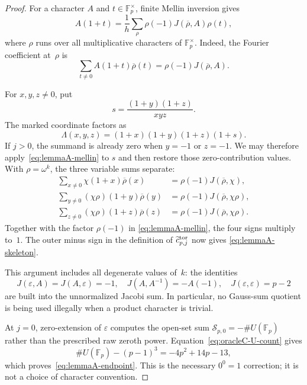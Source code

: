 \begin{proof}
For a character $A$ and $t\in\mathbb F_p^\times$, finite Mellin
inversion gives
\begin{equation}
 A(1+t)=\frac1h\sum_{\rho}
 \rho(-1)J(\overline\rho,A)\rho(t),
 \label{eq:lemmaA-mellin}
\end{equation}
where $\rho$ runs over all multiplicative characters of
$\mathbb F_p^\times$.  Indeed, the Fourier coefficient at~$\rho$ is
\[
 \sum_{t\ne0}A(1+t)\overline\rho(t)
 =\rho(-1)J(\overline\rho,A).
\]

For $x,y,z\ne0$, put
\[
 s=\frac{(1+y)(1+z)}{xyz}.
\]
The marked coordinate factors as
\begin{equation}
 \Lambda(x,y,z)=(1+x)(1+y)(1+z)(1+s).
 \label{eq:lemmaA-factor-Lambda}
\end{equation}
If $j>0$, the summand is already zero when $y=-1$ or $z=-1$.
We may therefore apply~\eqref{eq:lemmaA-mellin} to $s$ and then restore
those zero-contribution values.  With $\rho=\omega^k$, the three
variable sums separate:
\begin{align*}
 \sum_{x\ne0}\chi(1+x)\overline\rho(x)
   &=\rho(-1)J(\overline\rho,\chi),\\
 \sum_{y\ne0}(\chi\rho)(1+y)\overline\rho(y)
   &=\rho(-1)J(\overline\rho,\chi\rho),\\
 \sum_{z\ne0}(\chi\rho)(1+z)\overline\rho(z)
   &=\rho(-1)J(\overline\rho,\chi\rho).
\end{align*}
Together with the factor $\rho(-1)$ in
\eqref{eq:lemmaA-mellin}, the four signs multiply to~$1$.
The outer minus sign in the definition of
$\widetilde c_{p,j}^{\rm tor}$ now gives
\eqref{eq:lemmaA-skeleton}.

This argument includes all degenerate values of~$k$: the identities
\[
 J(\varepsilon,A)=J(A,\varepsilon)=-1,
 \quad J(A,A^{-1})=-A(-1),
 \quad J(\varepsilon,\varepsilon)=p-2
\]
are built into the unnormalized Jacobi sum.  In particular, no
Gauss-sum quotient is being used illegally when a product character is
trivial.

At $j=0$, zero-extension of $\varepsilon$ computes the open-set sum
$\mathscr S_{p,0}=-\#U(\mathbb F_p)$ rather than the prescribed raw
zeroth power.  Equation~\eqref{eq:oracleC-U-count} gives
\[
 \#U(\mathbb F_p)-(p-1)^3=-4p^2+14p-13,
\]
which proves~\eqref{eq:lemmaA-endpoint}.  This is the necessary
$0^0=1$ correction; it is not a choice of character convention.
\end{proof}

